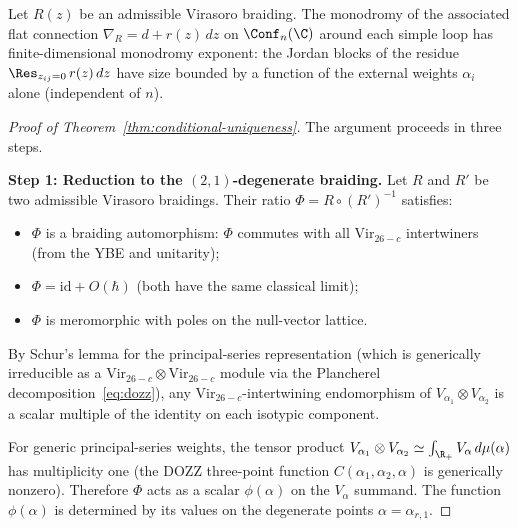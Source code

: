\begin{hypothesis}
\label{hyp:finite-monodromy}
Let $R(z)$ be an admissible Virasoro braiding. The monodromy
of the associated flat connection
$\nabla_R = d + r(z)\,dz$
on $\Conf_n(\C)$ around each simple loop has finite-dimensional
monodromy exponent: the Jordan blocks of the residue
$\Res_{z_{ij} = 0}\, r(z)\,dz$ have size bounded by a function
of the external weights $\alpha_i$ alone (independent of $n$).
\end{hypothesis}

\begin{proof}[Proof of Theorem~\textup{\ref{thm:conditional-uniqueness}}]
The argument proceeds in three steps.

\medskip
\noindent\textbf{Step 1: Reduction to the $(2,1)$-degenerate
braiding.}
Let $R$ and $R'$ be two admissible Virasoro braidings. Their
ratio $\Phi = R \circ (R')^{-1}$ satisfies:
\begin{itemize}
\item $\Phi$ is a braiding automorphism: $\Phi$ commutes with
 all $\mathrm{Vir}_{26-c}$ intertwiners (from the YBE and
 unitarity);
\item $\Phi = \mathrm{id} + O(\hbar)$ (both have the same
 classical limit);
\item $\Phi$ is meromorphic with poles on the null-vector lattice.
\end{itemize}
By Schur's lemma for the principal-series representation
(which is generically irreducible as a
$\mathrm{Vir}_{26-c} \otimes \mathrm{Vir}_{26-c}$ module via the
Plancherel decomposition~\eqref{eq:dozz}), any
$\mathrm{Vir}_{26-c}$-intertwining endomorphism of
$V_{\alpha_1} \otimes V_{\alpha_2}$ is a scalar multiple of the
identity on each isotypic component.

For generic principal-series weights, the tensor product
$V_{\alpha_1} \otimes V_{\alpha_2} \simeq \int_{\R_+}
V_\alpha\,d\mu(\alpha)$ has multiplicity one (the DOZZ
three-point function $C(\alpha_1,\alpha_2,\alpha)$ is generically
nonzero). Therefore $\Phi$ acts as a scalar $\phi(\alpha)$ on the
$V_\alpha$ summand. The function $\phi(\alpha)$ is determined
by its values on the degenerate points $\alpha = \alpha_{r,1}$.


\end{proof}
